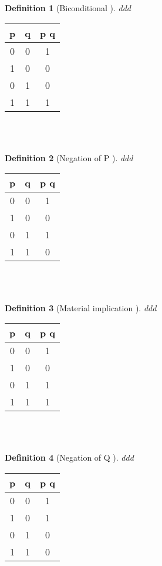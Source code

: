 \documentclass[10pt,a4paper,draft,titlepage,onecolumn]{book}
\newtheorem{definition}{Definition}[section]
\begin{document}
\begin{definition}[Biconditional ]ddd
\end{definition}
\begin{tabular}{ |c|c|c| }
 \hline
 p & q &  p  q  \\
 \hline
 0 & 0 & 1 \\
 1 & 0 & 0\\
 0 & 1 & 0\\
 1 & 1 & 1\\
 \hline
\end{tabular}\\\\

\begin{definition}[Negation of P ]ddd
\end{definition}
\begin{tabular}{ |c|c|c| }
 \hline
 p & q &  p  q  \\
 \hline
 0 & 0 & 1 \\
 1 & 0 & 0\\
 0 & 1 & 1\\
 1 & 1 & 0\\
 \hline
\end{tabular}\\\\



\begin{definition}[Material implication  ]ddd
\end{definition}
\begin{tabular}{ |c|c|c| }
 \hline
 p & q &  p  q  \\
 \hline
 0 & 0 & 1 \\
 1 & 0 & 0\\
 0 & 1 & 1\\
 1 & 1 & 1\\
 \hline
\end{tabular}\\\\

\begin{definition}[Negation of Q ]ddd
\end{definition}
\begin{tabular}{ |c|c|c| }
 \hline
 p & q &  p  q  \\
 \hline
 0 & 0 & 1 \\
 1 & 0 & 1\\
 0 & 1 & 0\\
 1 & 1 & 0\\
 \hline
\end{tabular}\\\\
\end{document}
